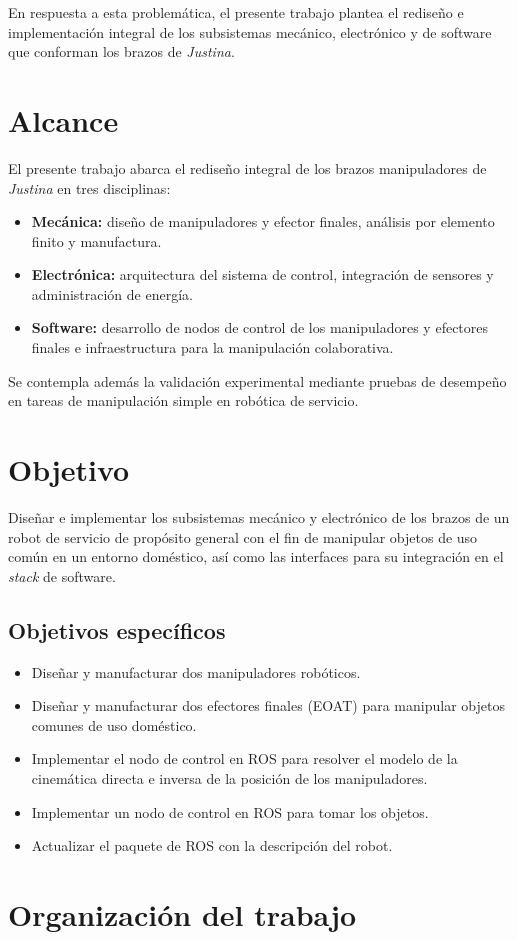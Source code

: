 En respuesta a esta problemática, el presente trabajo plantea el rediseño e implementación integral de los subsistemas mecánico, electrónico y de software que conforman los brazos de \emph{Justina}.

\section{Alcance}

El presente trabajo abarca el rediseño integral de los brazos manipuladores de \emph{Justina} en tres disciplinas:

\begin{itemize}
    \item \textbf{Mecánica:} diseño de manipuladores y efector finales, análisis por elemento finito y manufactura.
    \item \textbf{Electrónica:} arquitectura del sistema de control, integración de sensores y administración de energía.
    \item \textbf{Software:} desarrollo de nodos de control de los manipuladores y efectores finales e infraestructura para la manipulación colaborativa.
\end{itemize}

Se contempla además la validación experimental mediante pruebas de desempeño en tareas de manipulación simple en robótica de servicio.

\section{Objetivo}

Diseñar e implementar los subsistemas mecánico y electrónico de los brazos de un robot de servicio de propósito general con el fin de manipular objetos de uso común en un entorno doméstico, así como las interfaces para su integración en el \emph{stack} de software.

\subsection{Objetivos específicos}

\begin{itemize}
    \item Diseñar y manufacturar dos manipuladores robóticos.
    \item Diseñar y manufacturar dos efectores finales (EOAT) para manipular objetos comunes de uso doméstico.
    \item Implementar el nodo de control en ROS para resolver el modelo de la cinemática directa e inversa de la posición de los manipuladores.
    \item Implementar un nodo de control en ROS para tomar los objetos.
    \item Actualizar el paquete de ROS con la descripción del robot.
\end{itemize}

\section{Organización del trabajo}
